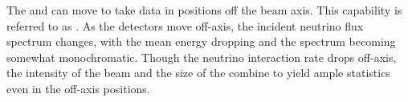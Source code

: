 The  and  can move to take data in positions off the beam axis.  This capability is referred to as . As the detectors move off-axis, the incident neutrino flux spectrum changes, with the mean energy dropping and the spectrum becoming somewhat monochromatic.  Though the neutrino interaction rate drops off-axis, the intensity of the beam and the size of the   combine to yield ample statistics even in the off-axis positions.

